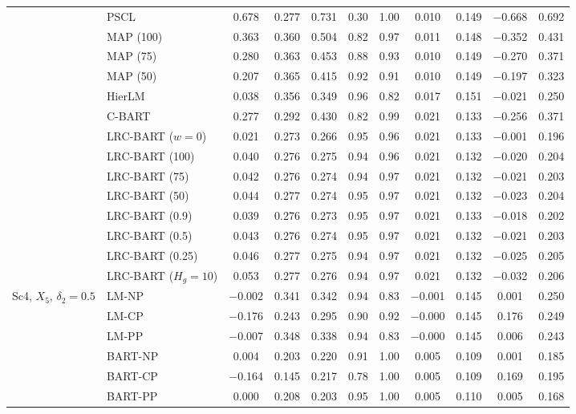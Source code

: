 \documentclass[11pt]{article}
\theoremstyle{definition}
\theoremstyle{plain}
\begin{document}
\begin{center}
\begin{longtable}{llccccccccc}
& PSCL & 0.678 & 0.277 & 0.731 & 0.30 & 1.00 & 0.010 & 0.149 & $-$0.668 & 0.692 \\
& MAP (100) & 0.363 & 0.360 & 0.504 & 0.82 & 0.97 & 0.011 & 0.148 & $-$0.352 & 0.431 \\
& MAP (75) & 0.280 & 0.363 & 0.453 & 0.88 & 0.93 & 0.010 & 0.149 & $-$0.270 & 0.371 \\
& MAP (50) & 0.207 & 0.365 & 0.415 & 0.92 & 0.91 & 0.010 & 0.149 & $-$0.197 & 0.323 \\
& HierLM & 0.038 & 0.356 & 0.349 & 0.96 & 0.82 & 0.017 & 0.151 & $-$0.021 & 0.250 \\
& C-BART & 0.277 & 0.292 & 0.430 & 0.82 & 0.99 & 0.021 & 0.133 & $-$0.256 & 0.371 \\
& LRC-BART ($w=0$) & 0.021 & 0.273 & 0.266 & 0.95 & 0.96 & 0.021 & 0.133 & $-$0.001 & 0.196 \\
& LRC-BART (100) & 0.040 & 0.276 & 0.275 & 0.94 & 0.96 & 0.021 & 0.132 & $-$0.020 & 0.204 \\
& LRC-BART (75) & 0.042 & 0.276 & 0.274 & 0.94 & 0.97 & 0.021 & 0.132 & $-$0.021 & 0.203 \\
& LRC-BART (50) & 0.044 & 0.277 & 0.274 & 0.95 & 0.97 & 0.021 & 0.132 & $-$0.023 & 0.204 \\
& LRC-BART (0.9) & 0.039 & 0.276 & 0.273 & 0.95 & 0.97 & 0.021 & 0.133 & $-$0.018 & 0.202 \\
& LRC-BART (0.5) & 0.043 & 0.276 & 0.274 & 0.95 & 0.97 & 0.021 & 0.132 & $-$0.021 & 0.203 \\
& LRC-BART (0.25) & 0.046 & 0.277 & 0.275 & 0.94 & 0.97 & 0.021 & 0.132 & $-$0.025 & 0.205 \\
& LRC-BART ($H_g=10$) & 0.053 & 0.277 & 0.276 & 0.94 & 0.97 & 0.021 & 0.132 & $-$0.032 & 0.206 \\
\midrule
\multirow{20}{*}{Sc4, $X_5$, $\delta_2=0.5$} & LM-NP & $-$0.002 & 0.341 & 0.342 & 0.94 & 0.83 & $-$0.001 & 0.145 & 0.001 & 0.250 \\
& LM-CP & $-$0.176 & 0.243 & 0.295 & 0.90 & 0.92 & $-$0.000 & 0.145 & 0.176 & 0.249 \\
& LM-PP & $-$0.007 & 0.348 & 0.338 & 0.94 & 0.83 & $-$0.000 & 0.145 & 0.006 & 0.243 \\
& BART-NP & 0.004 & 0.203 & 0.220 & 0.91 & 1.00 & 0.005 & 0.109 & 0.001 & 0.185 \\
& BART-CP & $-$0.164 & 0.145 & 0.217 & 0.78 & 1.00 & 0.005 & 0.109 & 0.169 & 0.195 \\
& BART-PP & 0.000 & 0.208 & 0.203 & 0.95 & 1.00 & 0.005 & 0.110 & 0.005 & 0.168 \\

\end{longtable}
\end{center}
\end{document}
